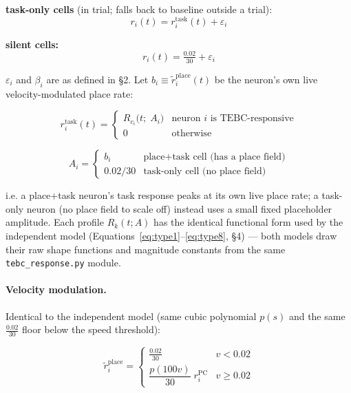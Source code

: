 \documentclass{article}
\begin{document}
\noindent
\textbf{task-only cells} (in trial; falls back to baseline outside a trial):
\begin{equation}
    r_i(t) = r^{\mathrm{task}}_i(t) + \varepsilon_i
\end{equation}

\noindent
\textbf{silent cells:}
\begin{equation}
    r_i(t) = \tfrac{0.02}{30} + \varepsilon_i
\end{equation}

\noindent
$\varepsilon_i$ and $\beta_i$ are as defined in \S2. Let $b_i \equiv \tilde{r}^{\mathrm{place}}_i(t)$
be the neuron's own live velocity-modulated place rate:

\begin{equation}
    r^{\mathrm{task}}_i(t) =
    \begin{cases}
        R_{c_i}\!\bigl(t;\; A_i\bigr) & \text{neuron } i \text{ is TEBC-responsive} \\
        0 & \text{otherwise}
    \end{cases}
\end{equation}

\begin{equation}
    A_i =
    \begin{cases}
        b_i & \text{place+task cell (has a place field)} \\
        0.02/30 & \text{task-only cell (no place field)}
    \end{cases}
\end{equation}

\noindent
i.e. a place+task neuron's task response peaks at its own live place rate; a task-only
neuron (no place field to scale off) instead uses a small fixed placeholder amplitude.
Each profile $R_k(t; A)$ has the identical functional form used by the independent
model (Equations~\eqref{eq:type1}--\eqref{eq:type8}, \S4) --- both models draw their
raw shape functions and magnitude constants from the same \texttt{tebc\_response.py}
module.

\paragraph{Velocity modulation.}
Identical to the independent model (same cubic polynomial $p(s)$ and the same
$\tfrac{0.02}{30}$ floor below the speed threshold):

\begin{equation}
    \tilde{r}^{\mathrm{place}}_i =
    \begin{cases}
        \tfrac{0.02}{30} & v < 0.02 \\[4pt]
        \dfrac{p(100v)}{30}\; r^{\mathrm{PC}}_i & v \geq 0.02
    \end{cases}
\end{equation}
\end{document}
